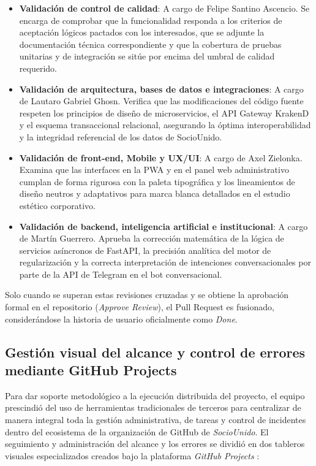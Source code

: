 \documentclass[conference, a4paper]{IEEEtran}
\begin{document}
\begin{itemize}
    \item \textbf{Validaci\'on de control de calidad}: A cargo de Felipe Santino Ascencio. Se encarga de comprobar que la funcionalidad responda a los criterios de aceptaci\'on l\'ogicos pactados con los interesados, que se adjunte la documentaci\'on t\'ecnica correspondiente y que la cobertura de pruebas unitarias y de integraci\'on se sit\'ue por encima del umbral de calidad requerido.
    \item \textbf{Validaci\'on de arquitectura, bases de datos e integraciones}: A cargo de Lautaro Gabriel Ghosn. Verifica que las modificaciones del c\'odigo fuente respeten los principios de dise\~no de microservicios, el API Gateway KrakenD y el esquema transaccional relacional, asegurando la \'optima interoperabilidad y la integridad referencial de los datos de SocioUnido.
    \item \textbf{Validaci\'on de front-end, Mobile y UX/UI}: A cargo de Axel Zielonka. Examina que las interfaces en la PWA y en el panel web administrativo cumplan de forma rigurosa con la paleta tipogr\'afica y los lineamientos de dise\~no neutros y adaptativos para marca blanca detallados en el estudio est\'etico corporativo.
    \item \textbf{Validaci\'on de backend, inteligencia artificial e institucional}: A cargo de Mart\'in Guerrero. Aprueba la correcci\'on matem\'atica de la l\'ogica de servicios as\'incronos de FastAPI, la precisi\'on anal\'itica del motor de regularizaci\'on y la correcta interpretaci\'on de intenciones conversacionales por parte de la API de Telegram en el bot conversacional.
\end{itemize}

Solo cuando se superan estas revisiones cruzadas y se obtiene la aprobaci\'on formal en el repositorio (\textit{Approve Review}), el Pull Request es fusionado, consider\'andose la historia de usuario oficialmente como \textit{Done}.

\subsection{Gesti\'on visual del alcance y control de errores mediante GitHub Projects}
Para dar soporte metodol\'ogico a la ejecuci\'on distribuida del proyecto, el equipo prescindi\'o del uso de herramientas tradicionales de terceros para centralizar de manera integral toda la gesti\'on administrativa, de tareas y control de incidentes dentro del ecosistema de la organizaci\'on de GitHub de \textit{SocioUnido}. El seguimiento y administraci\'on del alcance y los errores se dividi\'o en dos tableros visuales especializados creados bajo la plataforma \textit{GitHub Projects} :
\end{document}
